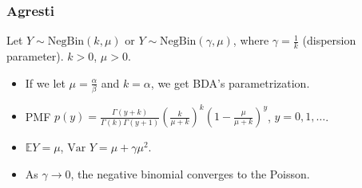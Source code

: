 \documentclass[twoside]{article}
\newcommand{\dis}{\displaystyle}
\newcommand\bbE{\mathbb{E}}
\newcommand\goesto{\rightarrow}
\newcommand\var{\text{Var }}
\begin{document}
\subsubsection*{Agresti}
Let $Y \sim \text{NegBin}(k, \mu)$ or $Y \sim \text{NegBin}(\gamma, \mu)$, where $\gamma = \dis\frac{1}{k}$ (dispersion parameter). $k > 0$, $\mu > 0$.
\begin{itemize}
\item If we let $\mu = \dis\frac{\alpha}{\beta}$ and $k = \alpha$, we get BDA's parametrization.

\item PMF $p(y) = \dis\frac{\Gamma(y+k)}{\Gamma(k)\Gamma(y+1)}\left(\frac{k}{\mu + k}\right)^k\left(1-\frac{\mu}{\mu + k}\right)^y$, $y = 0, 1, \dots$.

\item $\bbE Y = \mu$, $\var Y = \mu + \gamma \mu^2$.

\item As $\gamma \goesto 0$, the negative binomial converges to the Poisson.
\end{itemize}

\end{document}
